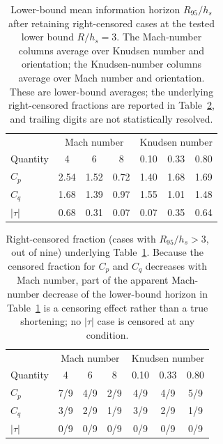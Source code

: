 \documentclass[aip,pof,preprint,floatfix,amsmath,amssymb]{revtex4-2}
\begin{document}
\begin{table}[t]
\centering
\caption{Lower-bound mean information horizon $R_{95}/h_s$ after retaining right-censored cases at the tested lower bound $R/h_s=3$. The Mach-number columns average over Knudsen number and orientation; the Knudsen-number columns average over Mach number and orientation. These are lower-bound averages; the underlying right-censored fractions are reported in Table~\ref{tab:R95censored}, and trailing digits are not statistically resolved.}
\label{tab:R95MaKn}
\begin{tabular}{lcccccc}
\toprule
& \multicolumn{3}{c}{Mach number} & \multicolumn{3}{c}{Knudsen number} \\
Quantity & 4 & 6 & 8 & 0.10 & 0.33 & 0.80 \\
\midrule
$C_p$ & 2.54 & 1.52 & 0.72 & 1.40 & 1.68 & 1.69 \\
$C_q$ & 1.68 & 1.39 & 0.97 & 1.55 & 1.01 & 1.48 \\
$|\tau|$ & 0.68 & 0.31 & 0.07 & 0.07 & 0.35 & 0.64 \\
\bottomrule
\end{tabular}
\end{table}

\begin{table}[t]
\centering
\caption{Right-censored fraction (cases with $R_{95}/h_s>3$, out of nine) underlying Table~\ref{tab:R95MaKn}. Because the censored fraction for $C_p$ and $C_q$ decreases with Mach number, part of the apparent Mach-number decrease of the lower-bound horizon in Table~\ref{tab:R95MaKn} is a censoring effect rather than a true shortening; no $|\tau|$ case is censored at any condition.}
\label{tab:R95censored}
\begin{tabular}{lcccccc}
\toprule
& \multicolumn{3}{c}{Mach number} & \multicolumn{3}{c}{Knudsen number} \\
Quantity & 4 & 6 & 8 & 0.10 & 0.33 & 0.80 \\
\midrule
$C_p$    & 7/9 & 4/9 & 2/9 & 4/9 & 4/9 & 5/9 \\
$C_q$    & 3/9 & 2/9 & 1/9 & 3/9 & 2/9 & 1/9 \\
$|\tau|$ & 0/9 & 0/9 & 0/9 & 0/9 & 0/9 & 0/9 \\
\bottomrule
\end{tabular}
\end{table}
\end{document}
